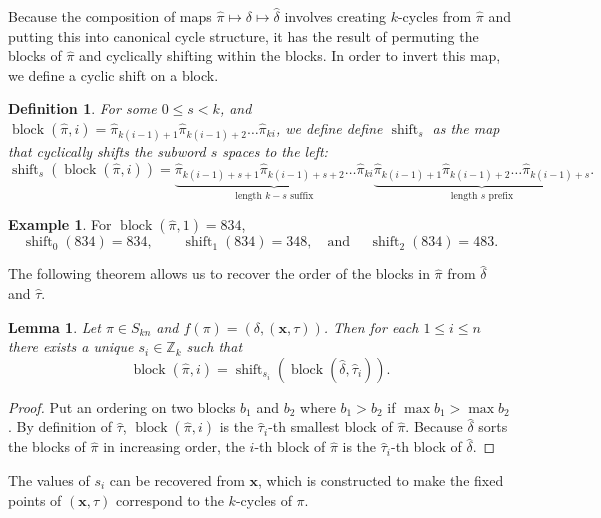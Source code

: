 \documentclass{article}
\numberwithin{theorem}{section}
\newtheorem{lemma}[theorem]{Lemma}
\newtheorem{definition}[theorem]{Definition}
\theoremstyle{definition}
\newtheorem{example}{Example}
\newcommand\pihat{\hat{\pi}}
\newcommand{\Z}{\mathbb{Z}}
\newcommand{\shift}{\operatorname{shift}}
\newcommand{\x}{\mathbf x}
\newcommand{\xtau}{(\x,\tau)}
\newcommand{\deltaxtau}{\left(\delta,\xtau\right)}
\newcommand{\shiftBlock}[1]{\shift_{s_{#1}}\!\!\left(\block(\hat\delta, \hat\tau_{#1})\right)}
\newcommand{\block}{\operatorname{block}}
\begin{document}
Because the composition of maps $\pihat \mapsto \delta \mapsto \hat\delta$ involves creating $k$-cycles from $\pihat$ and putting this into canonical cycle structure, it has the result of permuting the blocks of $\hat\pi$ and cyclically shifting within the blocks. In order to invert this map, we define a cyclic shift on a block.
\begin{definition}
    For some $0 \leq s < k$, and $\block(\hat\pi,i) = \pihat_{k(i-1) + 1}\pihat_{k(i-1) + 2}\dots\pihat_{ki}$, we define define $\shift_s$ as the map that cyclically shifts the subword $s$ spaces to the left:
    \[
        \operatorname{shift}_s(\block(\hat\pi,i)) =
        \underbrace{
        \pihat_{k(i-1) + s + 1}
        \pihat_{k(i-1) + s + 2}
        \dots
        \pihat_{ki}
        }_{\text{length $k-s$ suffix}}
        \underbrace{
        \pihat_{k(i-1) + 1}
        \pihat_{k(i-1) + 2}
        \dots
        \pihat_{k(i-1) + s}
        }_{\text{length $s$ prefix}}.
    \]
\end{definition}

\begin{example}
    For $\block(\hat\pi,1) = 834$,
    \[
        \operatorname{shift}_0(834) = 834,\qquad
        \operatorname{shift}_1(834) = 348,\quad\text{and }\quad
        \operatorname{shift}_2(834) = 483.
    \]
\end{example}

The following theorem allows us to recover the order of the blocks in $\pihat$ from $\hat\delta$ and $\hat\tau$.
\begin{lemma}\label{lem:delta-shifts}
    Let $\pi\in S_{kn}$ and $f(\pi)=\deltaxtau$.
    Then for each $1 \leq i \leq n$ there exists a unique $s_i \in \Z_k$ such that
    \[
        \block(\hat\pi, i) = \shiftBlock{i}\!.
    \]
\end{lemma}
\begin{proof}
    Put an ordering on two blocks $b_1$ and $b_2$ where $b_1 > b_2$ if $\max b_1 > \max b_2$.
    By definition of $\hat\tau$,
    $\block(\pihat,i)$ is the $\hat\tau_i$-th smallest block of $\pihat$. Because $\hat\delta$ sorts the blocks of $\pihat$ in increasing order, the $i$-th block of $\hat\pi$ is the $\hat\tau_i$-th block of $\hat\delta$.
\end{proof}

The values of $s_i$ can be recovered from $\x$, which is constructed to make the fixed points of $\xtau$ correspond to the $k$-cycles of $\pi$.
\end{document}
